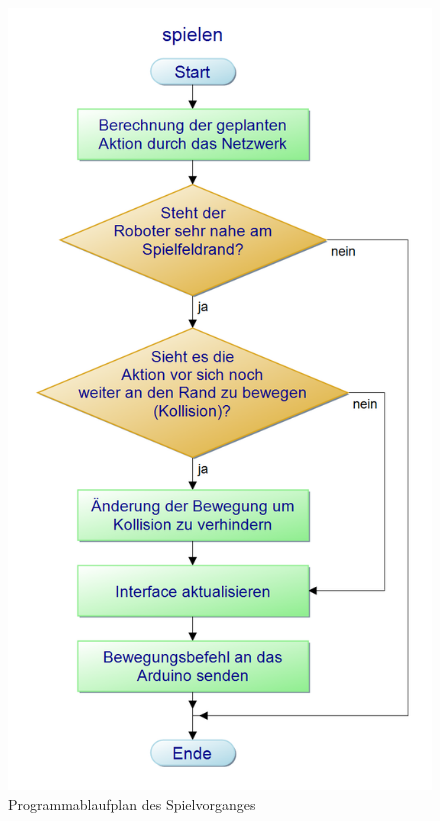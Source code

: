 \begin{figure} [h]
\begin{minipage}[t]{0.3\textwidth}
\includegraphics[scale =0.3]{images/spielen_pap}
 \caption{Programmablaufplan des Spielvorganges}
 \label{spiel_pap}
\end{minipage}
\end{figure}

\clearpage


